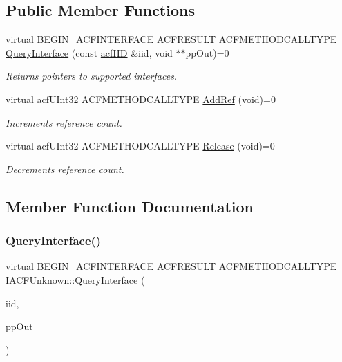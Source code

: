 \subsection*{Public Member Functions}
\begin{DoxyCompactItemize}
\item 
virtual B\+E\+G\+I\+N\+\_\+\+A\+C\+F\+I\+N\+T\+E\+R\+F\+A\+CE A\+C\+F\+R\+E\+S\+U\+LT A\+C\+F\+M\+E\+T\+H\+O\+D\+C\+A\+L\+L\+T\+Y\+PE \mbox{\hyperlink{a01409_a8b7f0ae9c78d007ca76aa462ebe53135}{Query\+Interface}} (const \mbox{\hyperlink{a00269_a59df0b41744eee7a066787aaedf97f67}{acf\+I\+ID}} \&iid, void $\ast$$\ast$pp\+Out)=0
\begin{DoxyCompactList}\small\item\em Returns pointers to supported interfaces. \end{DoxyCompactList}\item 
virtual acf\+U\+Int32 A\+C\+F\+M\+E\+T\+H\+O\+D\+C\+A\+L\+L\+T\+Y\+PE \mbox{\hyperlink{a01409_aa9c7a5b9dff341092b7b86bb9b3a58fb}{Add\+Ref}} (void)=0
\begin{DoxyCompactList}\small\item\em Increments reference count. \end{DoxyCompactList}\item 
virtual acf\+U\+Int32 A\+C\+F\+M\+E\+T\+H\+O\+D\+C\+A\+L\+L\+T\+Y\+PE \mbox{\hyperlink{a01409_afabd38cec0a9ed37f1d3e8644a70ac41}{Release}} (void)=0
\begin{DoxyCompactList}\small\item\em Decrements reference count. \end{DoxyCompactList}\end{DoxyCompactItemize}


\subsection{Member Function Documentation}
\mbox{\label{a01409_a8b7f0ae9c78d007ca76aa462ebe53135}} 
\subsubsection{\texorpdfstring{QueryInterface()}{QueryInterface()}}
{\footnotesize\ttfamily virtual B\+E\+G\+I\+N\+\_\+\+A\+C\+F\+I\+N\+T\+E\+R\+F\+A\+CE A\+C\+F\+R\+E\+S\+U\+LT A\+C\+F\+M\+E\+T\+H\+O\+D\+C\+A\+L\+L\+T\+Y\+PE I\+A\+C\+F\+Unknown\+::\+Query\+Interface (\begin{DoxyParamCaption}\item[{const \mbox{\hyperlink{a00269_a59df0b41744eee7a066787aaedf97f67}{acf\+I\+ID}} \&}]{iid,  }\item[{void $\ast$$\ast$}]{pp\+Out }\end{DoxyParamCaption})\hspace{0.3cm}{\ttfamily [pure virtual]}}



